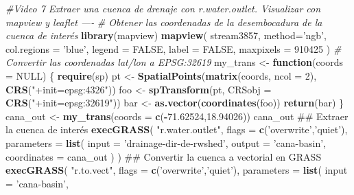 \documentclass[11pt,]{article}
\newenvironment{Shaded}{\begin{snugshade}}{\end{snugshade}}
\newcommand{\KeywordTok}[1]{\textcolor[rgb]{0.13,0.29,0.53}{\textbf{#1}}}
\newcommand{\DataTypeTok}[1]{\textcolor[rgb]{0.13,0.29,0.53}{#1}}
\newcommand{\DecValTok}[1]{\textcolor[rgb]{0.00,0.00,0.81}{#1}}
\newcommand{\FloatTok}[1]{\textcolor[rgb]{0.00,0.00,0.81}{#1}}
\newcommand{\StringTok}[1]{\textcolor[rgb]{0.31,0.60,0.02}{#1}}
\newcommand{\CommentTok}[1]{\textcolor[rgb]{0.56,0.35,0.01}{\textit{#1}}}
\newcommand{\OtherTok}[1]{\textcolor[rgb]{0.56,0.35,0.01}{#1}}
\newcommand{\ControlFlowTok}[1]{\textcolor[rgb]{0.13,0.29,0.53}{\textbf{#1}}}
\newcommand{\OperatorTok}[1]{\textcolor[rgb]{0.81,0.36,0.00}{\textbf{#1}}}
\newcommand{\NormalTok}[1]{#1}
\begin{document}
\begin{Shaded}
\begin{Highlighting}[]
\CommentTok{#Video 7 Extraer una cuenca de drenaje con r.water.outlet. Visualizar con mapview y leaflet ----}
\CommentTok{# Obtener las coordenadas de la desembocadura de la cuenca de interés}
\KeywordTok{library}\NormalTok{(mapview)}
\KeywordTok{mapview}\NormalTok{(}
\NormalTok{  stream3857, }\DataTypeTok{method=}\StringTok{'ngb'}\NormalTok{, }\DataTypeTok{col.regions =} \StringTok{'blue'}\NormalTok{,}
  \DataTypeTok{legend =} \OtherTok{FALSE}\NormalTok{, }\DataTypeTok{label =} \OtherTok{FALSE}\NormalTok{, }\DataTypeTok{maxpixels =}  \DecValTok{910425}
\NormalTok{)}
\CommentTok{# Convertir las coordenadas lat/lon a EPSG:32619}
\NormalTok{my_trans <-}\StringTok{ }\ControlFlowTok{function}\NormalTok{(}\DataTypeTok{coords =} \OtherTok{NULL}\NormalTok{) \{}
  \KeywordTok{require}\NormalTok{(sp)}
\NormalTok{  pt <-}\StringTok{ }\KeywordTok{SpatialPoints}\NormalTok{(}\KeywordTok{matrix}\NormalTok{(coords, }\DataTypeTok{ncol =} \DecValTok{2}\NormalTok{), }\KeywordTok{CRS}\NormalTok{(}\StringTok{"+init=epsg:4326"}\NormalTok{))}
\NormalTok{  foo <-}\StringTok{ }\KeywordTok{spTransform}\NormalTok{(pt, }\DataTypeTok{CRSobj =} \KeywordTok{CRS}\NormalTok{(}\StringTok{"+init=epsg:32619"}\NormalTok{))}
\NormalTok{  bar <-}\StringTok{ }\KeywordTok{as.vector}\NormalTok{(}\KeywordTok{coordinates}\NormalTok{(foo))}
  \KeywordTok{return}\NormalTok{(bar)}
\NormalTok{\}}
\NormalTok{cana_out <-}\StringTok{ }\KeywordTok{my_trans}\NormalTok{(}\DataTypeTok{coords =} \KeywordTok{c}\NormalTok{(}\OperatorTok{-}\FloatTok{71.62524}\NormalTok{,}\FloatTok{18.94026}\NormalTok{))}
\NormalTok{cana_out}
\NormalTok{## Extraer la cuenca de interés}
\KeywordTok{execGRASS}\NormalTok{(}
  \StringTok{"r.water.outlet"}\NormalTok{,}
  \DataTypeTok{flags =} \KeywordTok{c}\NormalTok{(}\StringTok{'overwrite'}\NormalTok{,}\StringTok{'quiet'}\NormalTok{),}
  \DataTypeTok{parameters =} \KeywordTok{list}\NormalTok{(}
    \DataTypeTok{input =} \StringTok{'drainage-dir-de-rwshed'}\NormalTok{,}
    \DataTypeTok{output =} \StringTok{'cana-basin'}\NormalTok{,}
    \DataTypeTok{coordinates =}\NormalTok{ cana_out}
\NormalTok{  )}
\NormalTok{)}
\NormalTok{## Convertir la cuenca a vectorial en GRASS}
\KeywordTok{execGRASS}\NormalTok{(}
  \StringTok{"r.to.vect"}\NormalTok{,}
  \DataTypeTok{flags =} \KeywordTok{c}\NormalTok{(}\StringTok{'overwrite'}\NormalTok{,}\StringTok{'quiet'}\NormalTok{),}
  \DataTypeTok{parameters =} \KeywordTok{list}\NormalTok{(}
    \DataTypeTok{input =} \StringTok{'cana-basin'}\NormalTok{,}

\end{Highlighting}
\end{Shaded}
\end{document}
